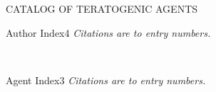 \documentclass{book}
\begin{document}
 

\begin{preface}






\clearemptydoublepage
\thispagestyle{empty}
\begingroup
\parindent0pt
\sffamily\LARGE\selectfont
\vspace*{56pt}  %
CATALOG OF TERATOGENIC AGENTS
\endgroup
\clearemptydoublepage

\end{preface}

% 


\setcounter{page}{1}

\relax

\begin{multicols}{2}
%

% 
\end{multicols}

\clearpage




\begin{shindex}{Author Index}{4}
{\it Citations are to entry numbers.}

\ \par

%

%
\end{shindex}

\begin{shindex}{Agent Index}{3}
{\it Citations are to entry numbers.}

\ \par

%

%
\end{shindex}
\end{document}

